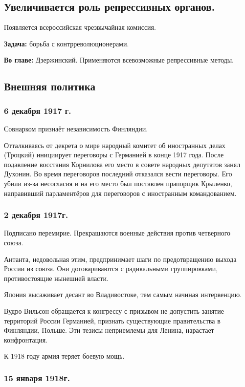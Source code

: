 \subsection{Увеличивается роль репрессивных органов.}

Появляется всероссийская чрезвычайная комиссия.

\textbf{Задача:} борьба с контрреволюционерами.

\textbf{Во главе:} Дзержинский.
Применяются всевозможные репрессивные методы.

\subsection{Внешняя политика}

\subsubsection{\textbf{6 декабря 1917 г.}}

Совнарком признаёт независимость Финляндии.

Отталкиваясь от декрета о мире народный комитет об иностранных делах (Троцкий) инициирует переговоры с Германией в конце 1917 года. После подавление восстания Корнилова его место в совете народных депутатов занял Духонин. Во время переговоров последний отказался вести переговоры. Его убили из-за несогласия и на его место был поставлен прапорщик Крыленко, направивший парламентёров для переговоров с иностранным командованием.

\subsubsection{\textbf{2 декабря 1917г.}}

Подписано перемирие. Прекращаются военные действия против четверного союза.

Антанта, недовольная этим, предпринимает шаги по предотвращению выхода России из союза. Они договариваются с радикальными группировками, противостоящие нынешней власти.

Япония высаживает десант во Владивостоке, тем самым начиная интервенцию.

Вудро Вильсон обращается к конгрессу с призывом не допустить занятие территорий России Германией, признать существующие правительства в Финляндии, Польше. Эти тезисы неприемлемы для Ленина, нарастает конфронтация.

К 1918 году армия теряет боевую мощь.

\subsubsection{\textbf{15 января 1918г.}}

